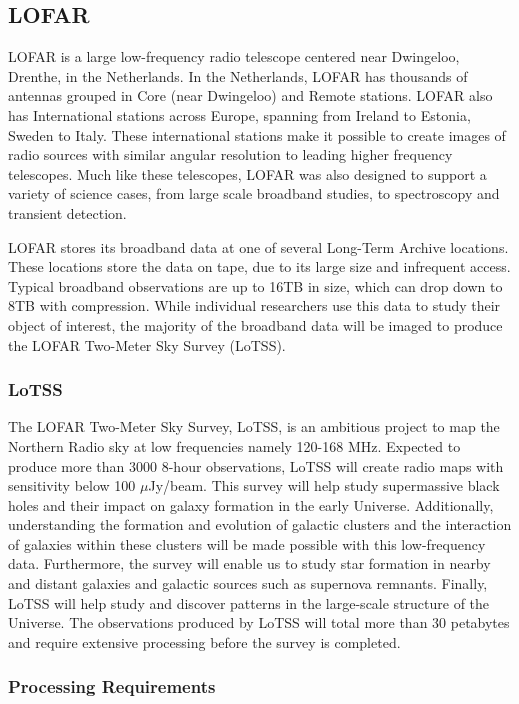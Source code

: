 \subsection{LOFAR}

LOFAR is a large low-frequency radio telescope centered near Dwingeloo, Drenthe, in the Netherlands. In the Netherlands, LOFAR has thousands of antennas grouped in Core (near Dwingeloo) and Remote stations. LOFAR also has International stations across Europe, spanning from Ireland to Estonia, Sweden to Italy. These international stations make it possible to create images of radio sources with similar angular resolution to leading higher frequency telescopes. Much like these telescopes, LOFAR was also designed to support a variety of science cases, from large scale broadband studies, to spectroscopy and transient detection. 

LOFAR stores its broadband data at one of several Long-Term Archive locations. These locations store the data on tape, due to its large size and infrequent access. Typical broadband observations are up to 16TB in size, which can drop down to 8TB with compression. While individual researchers use this data to study their object of interest, the majority of the broadband data will be imaged to produce the LOFAR Two-Meter Sky Survey (LoTSS). 

\subsubsection{LoTSS} 

The LOFAR Two-Meter Sky Survey, LoTSS, is an ambitious project to map the Northern Radio sky at low frequencies namely 120-168 MHz. Expected to produce more than 3000 8-hour observations, LoTSS will create radio maps with sensitivity below 100 $\mu$Jy/beam. This survey will help study supermassive black holes and their impact on galaxy formation in the early Universe. Additionally, understanding the formation and evolution of galactic clusters and the interaction of galaxies within these clusters will be made possible with this low-frequency data. Furthermore, the survey will enable us to study star formation in nearby and distant galaxies and galactic sources such as supernova remnants. Finally, LoTSS will help study and discover patterns in the large-scale structure of the Universe.  The observations produced by LoTSS will total more than 30 petabytes and require extensive processing before the survey is completed. 

\subsubsection{Processing Requirements}   

